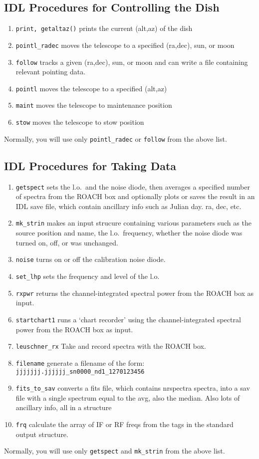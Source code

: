 \documentclass[psfig,preprint]{aastex}
\begin{document}
\subsection{IDL Procedures for Controlling the Dish}
\begin{enumerate}
\item {\tt print, getaltaz()} prints the current (alt,az) of the dish
\item {\tt pointl\_radec} moves the telescope to a specified (ra,dec),
  sun, or moon
\item {\tt follow} tracks a given (ra,dec), sun, or moon and can write a
  file containing relevant pointing data.
\item {\tt pointl} moves the telescope to a specified (alt,az)
\item {\tt maint} moves the telescope to maintenance position
\item {\tt stow} moves the telescope to stow position
\end{enumerate}
Normally, you will use only {\tt pointl\_radec} or {\tt follow} from the
above list.

\subsection{IDL Procedures for Taking Data}
\begin{enumerate}
\item {\tt getspect} sets the l.o.\ and the noise diode, then averages a
  specified number of spectra from the ROACH box and optionally plots or
  saves the result in an IDL save file, which contain ancillary info
  such as Julian day. ra, dec, etc.
\item {\tt mk\_strin} makes an input strucure containing various
  parameters such as the source position and name, the l.o.\ frequency,
  whether the noise diode was turned on, off, or was unchanged.
\item {\tt noise} turns on or off the calibration noise diode.
\item {\tt set\_lhp} sets the frequency and level of the l.o.
\item {\tt rxpwr} returns the channel-integrated spectral power from the
  ROACH box as input.
\item {\tt startchart1} runs a `chart recorder' using the
  channel-integrated spectral power from the ROACH box as input. 
\item {\tt leuschner\_rx} Take and record spectra with the ROACH box.
\item {\tt filename} generate a filename of the form:
  {\tt jjjjjjj.jjjjjj\_sn0000\_nd1\_1270123456}
\item {\tt fits\_to\_sav} converts a fits file, which contains nrspectra
  spectra, into a sav file with a single spectrum equal to the avg,
  also the median. Also lots of ancillary info, all in a structure
\item {\tt frq} calculate the array of IF or RF freqs from the tags in
  the standard output structure.
\end{enumerate}
Normally, you will use only {\tt getspect} and {\tt mk\_strin} from the
  above list.
\end{document}
